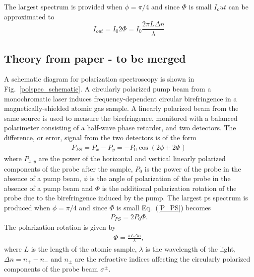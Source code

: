 The largest spectrum is provided when $\phi=\pi/4$ and since $\Phi$ is small $I_out$ can be approximated to
\begin{equation}
I_{out} = I_0 2\Phi = I_0 \frac{2\pi L \Delta n}{\lambda}
\end{equation}

\subsection{Theory from paper - to be merged}
A schematic diagram for polarization spectroscopy is shown in Fig.~\ref{polspec_schematic}.
A circularly polarized pump beam from a monochromatic laser induces frequency-dependent circular birefringence in a magnetically-shielded atomic gas sample.
A linearly polarized beam from the same source is used to measure the birefringence, monitored with a balanced polarimeter consisting of a half-wave phase retarder,  and two detectors.
The difference, or error, signal from the two detectors is of the form \cite{pearman_polarization_2002}
\begin{align}
P_{PS} = P_x-P_y = -P_0 \cos(2\phi+2\Phi)\label{P_PS}
\end{align}
where $P_{x,y}$ are the power of the horizontal and vertical linearly polarized components of the probe after the sample, $P_0$ is the power of the probe in the absence of a pump beam, $\phi$ is the angle of polarization of the probe in the absence of a pump beam and $\Phi$ is the additional polarization rotation of the probe due to the birefringence induced by the pump.
The largest \gls*{ps} spectrum is produced when $\phi=\pi/4$ and since $\Phi$ is small Eq.~(\ref{P_PS})  becomes
\begin{align}
P_{PS} = 2P_0 \Phi.
\end{align}
The polarization rotation is given by
\begin{align}
\Phi = \frac{\pi L \Delta n}{\lambda},
\end{align}
where $L$ is the length of the atomic sample, $\lambda$ is the wavelength of the light, $\Delta n = n_+ - n_-$ and $n_\pm$ are the refractive indices affecting the circularly polarized components of the probe beam $\sigma^\pm$.
